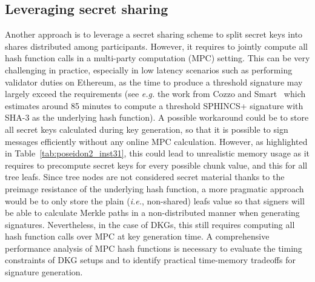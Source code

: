 \subsection{Leveraging secret sharing}
Another approach is to leverage a secret sharing scheme to split \WOTS secret keys into shares distributed among participants.
However, it requires to jointly compute all hash function calls in a multi-party computation (MPC) setting.
This can be very challenging in practice, especially in low latency scenarios such as performing validator duties on Ethereum, as the time to produce a threshold signature may largely exceed the requirements (see \textit{e.g.} the work from Cozzo and Smart~\cite{sharing_luov19} which estimates around 85 minutes to compute a threshold \textsf{SPHINCS+} signature with \textsf{SHA-3} as the underlying hash function).
A possible workaround could be to store all secret keys calculated during key generation, so that it is possible to sign messages efficiently without any online MPC calculation.
However, as highlighted in Table~\ref{tab:poseidon2_inst31}, this could lead to unrealistic memory usage as it requires to precompute secret keys for every possible chunk value, and this for all tree leafs.
Since tree nodes are not considered secret material thanks to the preimage resistance of the underlying hash function, a more pragmatic approach would be to only store the plain (\textit{i.e.}, non-shared) leafs value so that signers will be able to calculate Merkle paths in a non-distributed manner when generating signatures.
Nevertheless, in the case of DKGs, this still requires computing all hash function calls over MPC at key generation time.
A comprehensive performance analysis of MPC hash functions is necessary to evaluate the timing constraints of DKG setups and to identify practical time-memory tradeoffs for signature generation.





